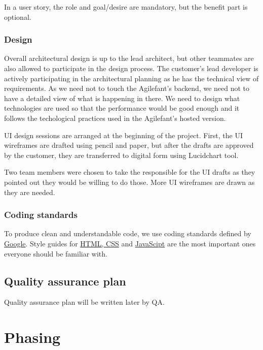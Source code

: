 In a user story, the role and goal/desire are mandatory, but the benefit part is 
optional.

\subsubsection{Design}

Overall architectural design is up to the lead architect, but other teammates
are also allowed to participate in the design process. The customer's lead
developer is actively participating in the architectural planning as he has the
technical view of requirements. As we need not to touch the Agilefant's backend,
we need not to have a detailed view of what is happening in there. We need to
design what technologies are used so that the performance would be good enough and it
follows the techological practices used in the Agilefant's hosted version.

UI design sessions are arranged at the beginning of the project. First, the UI
wireframes are drafted using pencil and paper, but after the drafts are approved
by the customer, they are transferred to digital form using Lucidchart tool.

Two team members were chosen to take the responsible for the UI drafts as they
pointed out they would be willing to do those. More UI wireframes are drawn as
they are needed.

\subsubsection{Coding standards}

To produce clean and understandable code, we use coding standards defined by
\href{http://code.google.com/p/google-styleguide/}{Google}. Style guides for
\href{http://google-styleguide.googlecode.com/svn/trunk/htmlcssguide.xml}{HTML,
CSS} and
\href{http://google-styleguide.googlecode.com/svn/trunk/javascriptguide.xml}{JavaScipt} are the most important ones everyone should be familiar with.

\subsection{Quality assurance plan}

Quality assurance plan will be written later by QA.

\section{Phasing}

